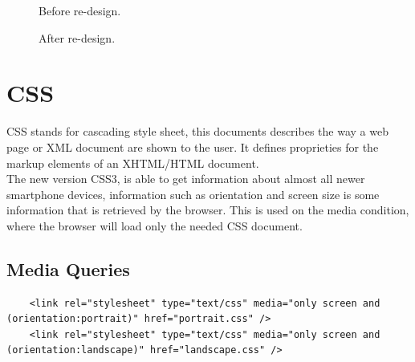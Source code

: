 \begin{figure}[h!]
	\center
		\setlength\fboxsep{0pt}
		\setlength\fboxrule{1pt}
   	\caption{Before re-design.}
\end{figure}


\begin{figure}[h!]
	\center
		\setlength\fboxsep{0pt}
		\setlength\fboxrule{1pt}
   	\caption{After re-design.}
\end{figure}

\section{CSS}  %

CSS stands for cascading style sheet, this documents describes the way a web page or XML document are shown to the user. It defines proprieties for the markup elements of an XHTML/HTML document.
\\
The new version CSS3, is able to get information about almost all newer smartphone devices, information such as orientation and screen size is some information that is retrieved by the browser. This is used on the media condition, where the browser will load only the needed CSS document.

\subsection{Media Queries}

\begin{lstlisting}
	<link rel="stylesheet" type="text/css" media="only screen and (orientation:portrait)" href="portrait.css" />
	<link rel="stylesheet" type="text/css" media="only screen and (orientation:landscape)" href="landscape.css" />
\end{lstlisting}

